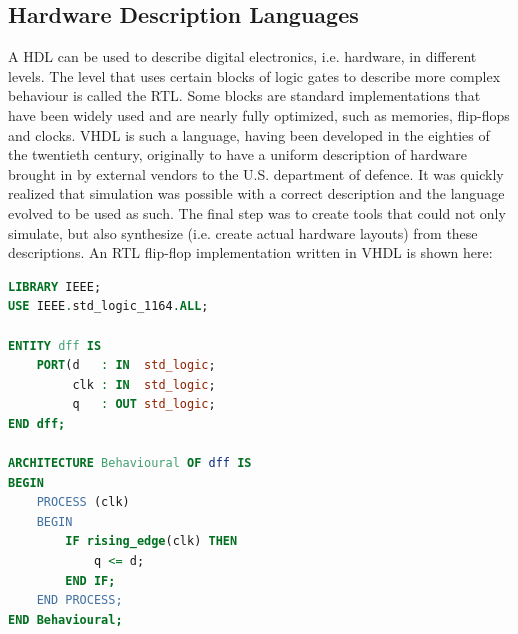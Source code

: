 \documentclass[11pt,british]{article}
\begin{document}
%

\subsection{Hardware Description Languages}
\label{subsec:HDL}
A \gls{HDL} can be used to describe digital electronics, i.e. hardware, in different levels. The level that uses certain blocks of logic gates to describe more complex behaviour is called the \gls{RTL}. Some blocks are standard implementations that have been widely used and are nearly fully optimized, such as memories, flip-flops and clocks. \gls{VHDL} is such a language, having been developed in the eighties of the twentieth century, originally to have a uniform description of hardware brought in by external vendors to the U.S. department of defence. It was quickly realized that simulation was possible with a correct description and the language evolved to be used as such.\cite{vhdlorigin,vhdlorigin2} The final step was to create tools that could not only simulate, but also synthesize (i.e. create actual hardware layouts) from these descriptions.\cite{vhdlsim, vhdlsynth, vhdlsynth2, vhdlsynth3} An \gls{RTL} flip-flop implementation written in \gls{VHDL} is shown here: 
\begin{lstlisting}[language=VHDL, tabsize=4, frame=single, framesep=2mm, belowskip=16pt, aboveskip=16pt, showstringspaces=false, basicstyle=\footnotesize]
LIBRARY IEEE;
USE IEEE.std_logic_1164.ALL;

ENTITY dff IS
	PORT(d 	 : IN  std_logic;
		 clk : IN  std_logic;
		 q 	 : OUT std_logic;
END dff;

ARCHITECTURE Behavioural OF dff IS
BEGIN
	PROCESS (clk)
	BEGIN
		IF rising_edge(clk) THEN
			q <= d;
		END IF;
	END PROCESS;
END Behavioural;
\end{lstlisting}
\end{document}
